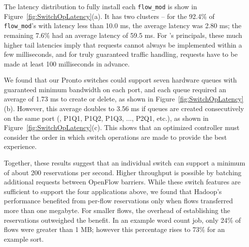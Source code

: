The latency distribution to fully install each \verb/flow_mod/ is show in
Figure~\ref{fig:SwitchOpLatency}(a). It has two clusters -- for the 92.4\% of
\verb/flow_mod/'s with latency less than 10.0 ms, the average latency
was 2.80 ms; the remaining 7.6\% had an average latency of 59.5 ms.
For \sys's principals, these much higher tail latencies imply that requests
cannot always be implemented within a few milliseconds, and for truly
guaranteed traffic handling, requests have to be made at least 100
milliseconds in advance.

We found that our Pronto switches could support seven hardware
queues with guaranteed minimum bandwidth on each port, and each
queue required an average of 1.73 ms to create or delete, as shown in
Figure~\ref{fig:SwitchOpLatency}(b). However, this average doubles to 3.56 ms
if queues are created consecutively on the same port (\ie, P1Q1, P1Q2,
P1Q3, ..., P2Q1, etc.), as shown in Figure~\ref{fig:SwitchOpLatency}(c).
This shows that an optimized \sys controller must consider the order in
which switch operations are made to provide the best experience.%

Together, these results suggest that an
individual switch can support a minimum of about 200 reservations
per second. Higher throughput is possible by batching additional requests
between OpenFlow barriers.
While these switch features are sufficient to support the four applications
above, we found that Hadoop's performance benefited from per-flow
reservations only when flows transferred more than one megabyte. For
smaller flows, the overhead of establishing the reservations outweighed
the benefit.
In an example word count job, only 24\% of flows were greater
than 1 MB; however this percentage rises to 73\% for an example sort.

